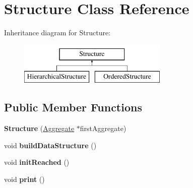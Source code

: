 \hypertarget{classStructure}{\section{Structure Class Reference}
\label{classStructure}
}
Inheritance diagram for Structure\-:\begin{figure}[H]
\begin{center}
\leavevmode
\includegraphics[height=2.000000cm]{classStructure}
\end{center}
\end{figure}
\subsection*{Public Member Functions}
\begin{DoxyCompactItemize}
\item 
\hypertarget{classStructure_ab729d3655c6f8cc57a017990505ca801}{{\bfseries Structure} (\hyperlink{classAggregate}{Aggregate} $\ast$first\-Aggregate)}\label{classStructure_ab729d3655c6f8cc57a017990505ca801}

\item 
\hypertarget{classStructure_a58ba69b728af41d799e311ccfa681ad1}{void {\bfseries build\-Data\-Structure} ()}\label{classStructure_a58ba69b728af41d799e311ccfa681ad1}

\item 
\hypertarget{classStructure_a398196a737f5e5b4bf7e2358531025f0}{void {\bfseries init\-Reached} ()}\label{classStructure_a398196a737f5e5b4bf7e2358531025f0}

\item 
\hypertarget{classStructure_af0552334481ce744845b343590263a46}{void {\bfseries print} ()}\label{classStructure_af0552334481ce744845b343590263a46}

\end{DoxyCompactItemize}
